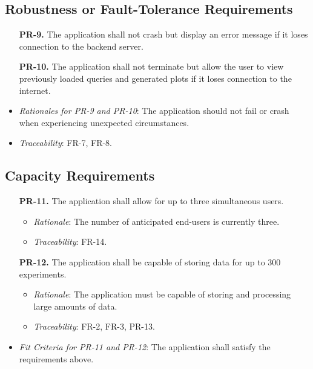 \documentclass[12pt]{article}
\begin{document}
\subsection{Robustness or Fault-Tolerance Requirements}
\begin{enumerate}
  \item[\textbf{PR-9.}] The application shall not crash but display an error message if it loses connection to the backend server.
  \item[\textbf{PR-10.}] The application shall not terminate but allow the user to view previously loaded queries and generated plots if it loses connection to the internet.
\end{enumerate}
\begin{itemize}
  \item \textit{Rationales for PR-9 and PR-10}: The application should not fail or crash when experiencing unexpected circumstances.
  \item \textit{Traceability}: FR-7, FR-8.
\end{itemize}

\subsection{Capacity Requirements}
\begin{enumerate}
  \item[\textbf{PR-11.}] The application shall allow for up to three simultaneous users.
    \begin{itemize}
      \item \textit{Rationale}: The number of anticipated end-users is currently three.
      \item \textit{Traceability}: FR-14.
    \end{itemize}
  \item[\textbf{PR-12.}] The application shall be capable of storing data for up to 300 experiments.
    \begin{itemize}
      \item \textit{Rationale}: The application must be capable of storing and processing large amounts of data.
      \item \textit{Traceability}: FR-2, FR-3, PR-13.
    \end{itemize}
\end{enumerate}
\begin{itemize}
  \item \textit{Fit Criteria for PR-11 and PR-12}: The application shall satisfy the requirements above.
\end{itemize}
\end{document}
